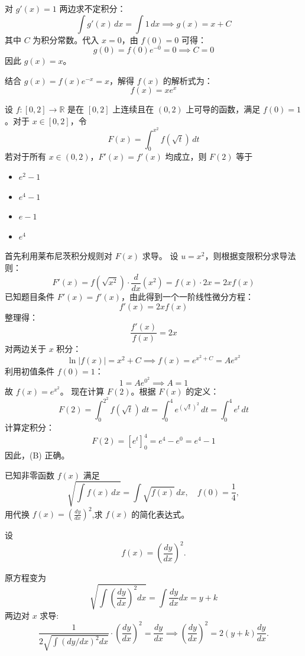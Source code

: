 \begin{questions}
\begin{parts}
\begin{solution}
对 $g'(x) = 1$ 两边求不定积分：
\[
\int g'(x) \,dx = \int 1 \,dx \implies g(x) = x + C
\]
其中 $C$ 为积分常数。代入 $x = 0$，由 $f(0) = 0$ 可得：
\[
g(0) = f(0) e^{-0} = 0 \implies C = 0
\]
因此 $g(x) = x$。

结合 $g(x) = f(x) e^{-x} = x$，解得 $f(x)$ 的解析式为：
\[
f(x) = x e^x
\]
\end{solution}
\end{parts}

    \question 设 $f: [0, 2] \to \mathbb{R}$ 是在 $[0, 2]$ 上连续且在 $(0, 2)$ 上可导的函数，满足 $f(0) = 1$。对于 $x \in [0, 2]$，令
\[
F(x) = \int_{0}^{x^2} f(\sqrt{t}) \,dt
\]
若对于所有 $x \in (0, 2)$，$F'(x) = f'(x)$ 均成立，则 $F(2)$ 等于

\begin{itemize}
    \item[(A)] $e^2 - 1$
    \item[(B)] $e^4 - 1$
    \item[(C)] $e - 1$
    \item[(D)] $e^4$
\end{itemize}

\begin{solution}
首先利用莱布尼茨积分规则对 $F(x)$ 求导。
设 $u = x^2$，则根据变限积分求导法则：
\[
F'(x) = f(\sqrt{x^2}) \cdot \frac{d}{dx}(x^2) = f(x) \cdot 2x = 2xf(x)
\]
已知题目条件 $F'(x) = f'(x)$，由此得到一个一阶线性微分方程：
\[
f'(x) = 2xf(x)
\]
整理得：
\[
\frac{f'(x)}{f(x)} = 2x
\]
对两边关于 $x$ 积分：
\[
\ln |f(x)| = x^2 + C \implies f(x) = e^{x^2 + C} = A e^{x^2}
\]
利用初值条件 $f(0) = 1$：
\[
1 = A e^{0^2} \implies A = 1
\]
故 $f(x) = e^{x^2}$。
现在计算 $F(2)$。根据 $F(x)$ 的定义：
\[
F(2) = \int_{0}^{2^2} f(\sqrt{t}) \,dt = \int_{0}^{4} e^{(\sqrt{t})^2} \,dt = \int_{0}^{4} e^t \,dt
\]
计算定积分：
\[
F(2) = \left[ e^t \right]_{0}^{4} = e^4 - e^0 = e^4 - 1
\]
因此，(B) 正确。
\end{solution}

    \question 已知非零函数 $f(x)$ 满足
\[
\sqrt{\int f(x) \, dx} = \int \sqrt{f(x)} \, dx, \quad f(0)=\frac{1}{4},
\]
用代换 $f(x) = \left(\frac{dy}{dx}\right)^2$,求 $f(x)$ 的简化表达式。

\begin{solution}
设
\[
f(x) = \left(\frac{dy}{dx}\right)^2.
\]

原方程变为
\[
\sqrt{\int \left(\frac{dy}{dx}\right)^2 dx} = \int \frac{dy}{dx} dx = y + k
\]
两边对 $x$ 求导:
\[
\frac{1}{2\sqrt{\int (dy/dx)^2 dx}} \cdot \left(\frac{dy}{dx}\right)^2 = \frac{dy}{dx} \implies \left(\frac{dy}{dx}\right)^2 = 2(y+k) \frac{dy}{dx}.
\]


\end{solution}
\end{questions}
